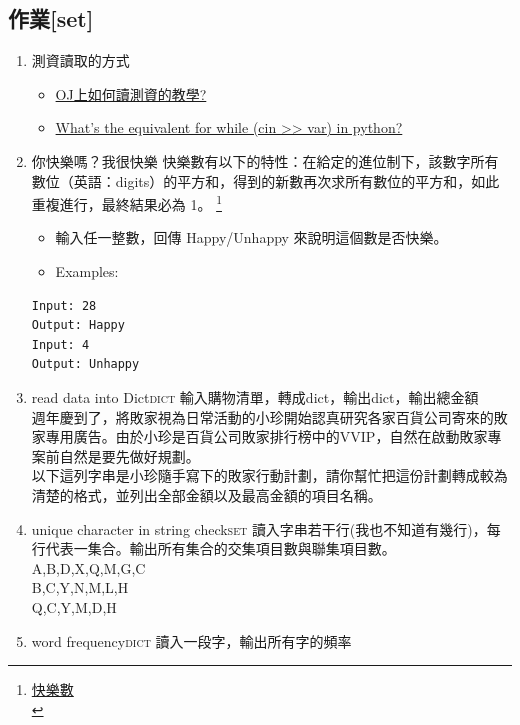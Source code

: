 \documentclass[a4paper,12pt]{article}
\begin{document}
\subsection{作業[set]}
\label{sec:org1b0c47b}
\begin{enumerate}
\item 測資讀取的方式
\label{sec:org3b902fb}
\begin{itemize}
\item \href{https://ithelp.ithome.com.tw/articles/10230292}{OJ上如何讀測資的教學? }\\
\item \href{https://stackoverflow.com/questions/28990034/whats-the-equivalent-for-while-cin-var-in-python}{What's the equivalent for while (cin >> var) in python?}\\
\end{itemize}
\item 你快樂嗎？我很快樂
\label{sec:org3d7449d}
快樂數有以下的特性：在給定的進位制下，該數字所有數位（英語：digits）的平方和，得到的新數再次求所有數位的平方和，如此重複進行，最終結果必為 1。 \footnote{\href{https://zh.wikipedia.org/wiki/\%E5\%BF\%AB\%E6\%A8\%82\%E6\%95\%B8}{快樂數}\\}\\
\begin{itemize}
\item 輸入任一整數，回傳 Happy/Unhappy 來說明這個數是否快樂。\\
\item Examples:\\
\end{itemize}
\begin{verbatim}
Input: 28
Output: Happy
Input: 4
Output: Unhappy
\end{verbatim}
\item read data into Dict\hfill{}\textsc{dict}
\label{sec:org1937a09}
輸入購物清單，轉成dict，輸出dict，輸出總金額\\
週年慶到了，將敗家視為日常活動的小珍開始認真研究各家百貨公司寄來的敗家專用廣告。由於小珍是百貨公司敗家排行榜中的VVIP，自然在啟動敗家專案前自然是要先做好規劃。\\
以下這列字串是小珍隨手寫下的敗家行動計劃，請你幫忙把這份計劃轉成較為清楚的格式，並列出全部金額以及最高金額的項目名稱。\\

\item unique character in string check\hfill{}\textsc{set}
\label{sec:org7022994}
讀入字串若干行(我也不知道有幾行)，每行代表一集合。輸出所有集合的交集項目數與聯集項目數。\\
A,B,D,X,Q,M,G,C\\
B,C,Y,N,M,L,H\\
Q,C,Y,M,D,H\\
\item word frequency\hfill{}\textsc{dict}
\label{sec:org94dbf2f}
讀入一段字，輸出所有字的頻率\\
\end{enumerate}
\end{document}
